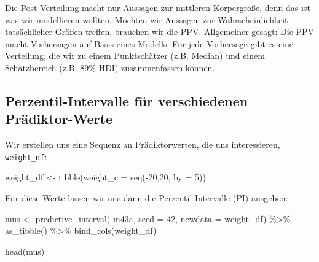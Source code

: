 \documentclass[
  a4paper,
  DIV=11]{scrreprt}
\newenvironment{Shaded}{\begin{snugshade}}{\end{snugshade}}
\newcommand{\AttributeTok}[1]{\textcolor[rgb]{0.40,0.45,0.13}{#1}}
\newcommand{\DecValTok}[1]{\textcolor[rgb]{0.68,0.00,0.00}{#1}}
\newcommand{\FunctionTok}[1]{\textcolor[rgb]{0.28,0.35,0.67}{#1}}
\newcommand{\NormalTok}[1]{\textcolor[rgb]{0.00,0.23,0.31}{#1}}
\newcommand{\OtherTok}[1]{\textcolor[rgb]{0.00,0.23,0.31}{#1}}
\newcommand{\SpecialCharTok}[1]{\textcolor[rgb]{0.37,0.37,0.37}{#1}}
\theoremstyle{definition}
\theoremstyle{remark}
\begin{document}
\begin{tcolorbox}[enhanced jigsaw, title=\textcolor{quarto-callout-important-color}{\faExclamation}\hspace{0.5em}{Wichtig}, bottomtitle=1mm, bottomrule=.15mm, titlerule=0mm, colbacktitle=quarto-callout-important-color!10!white, colframe=quarto-callout-important-color-frame, leftrule=.75mm, left=2mm, toprule=.15mm, colback=white, arc=.35mm, breakable, toptitle=1mm, opacityback=0, rightrule=.15mm, coltitle=black, opacitybacktitle=0.6]

Die Post-Verteilung macht nur Aussagen zur mittleren Körpergröße, denn
das ist was wir modellieren wollten. Möchten wir Aussagen zur
Wahrscheinlichkeit tatsächlicher Größen treffen, brauchen wir die PPV.
Allgemeiner gesagt: Die PPV macht Vorhersagen auf Basis eines Modells.
Für jede Vorhersage gibt es eine Verteilung, die wir zu einem
Punktschätzer (z.B. Median) und einem Schätzbereich (z.B. 89\%-HDI)
zusammenfassen können.

\end{tcolorbox}

\hypertarget{perzentil-intervalle-fuxfcr-verschiedenen-pruxe4diktor-werte}{%
\subsection{Perzentil-Intervalle für verschiedenen
Prädiktor-Werte}\label{perzentil-intervalle-fuxfcr-verschiedenen-pruxe4diktor-werte}}

Wir erstellen uns eine Sequenz an Prädiktorwerten, die uns
interessieren, \texttt{weight\_df}:

\begin{Shaded}
\begin{Highlighting}[]
\NormalTok{weight\_df }\OtherTok{\textless{}{-}} \FunctionTok{tibble}\NormalTok{(}\AttributeTok{weight\_c =} \FunctionTok{seq}\NormalTok{(}\SpecialCharTok{{-}}\DecValTok{20}\NormalTok{,}\DecValTok{20}\NormalTok{, }\AttributeTok{by =} \DecValTok{5}\NormalTok{))}
\end{Highlighting}
\end{Shaded}

Für diese Werte lassen wir uns dann die Perzentil-Intervalle (PI)
ausgeben:

\begin{Shaded}
\begin{Highlighting}[]
\NormalTok{mus }\OtherTok{\textless{}{-}} 
  \FunctionTok{predictive\_interval}\NormalTok{(}
\NormalTok{    m43a, }
    \AttributeTok{seed =} \DecValTok{42}\NormalTok{,}
    \AttributeTok{newdata =}\NormalTok{ weight\_df) }\SpecialCharTok{\%\textgreater{}\%} 
  \FunctionTok{as\_tibble}\NormalTok{() }\SpecialCharTok{\%\textgreater{}\%} 
  \FunctionTok{bind\_cols}\NormalTok{(weight\_df)}

\FunctionTok{head}\NormalTok{(mus)}
\end{Highlighting}
\end{Shaded}
\end{document}
